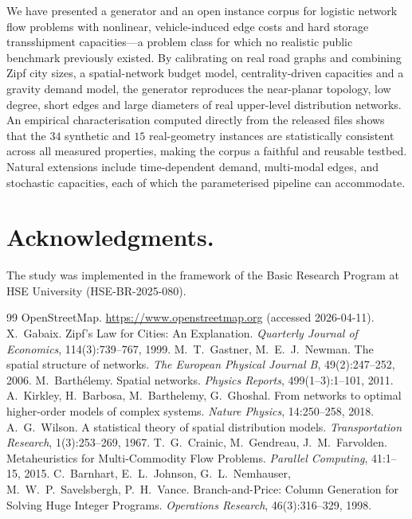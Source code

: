 \documentclass[11pt]{article}
\begin{document}
We have presented a generator and an open instance corpus for logistic network
flow problems with nonlinear, vehicle-induced edge costs and hard storage
transshipment capacities---a problem class for which no realistic public
benchmark previously existed. By calibrating on real road graphs and combining
Zipf city sizes, a spatial-network budget model, centrality-driven capacities and
a gravity demand model, the generator reproduces the near-planar topology, low
degree, short edges and large diameters of real upper-level distribution
networks. An empirical characterisation computed directly from the released files
shows that the $34$ synthetic and $15$ real-geometry instances are statistically
consistent across all measured properties, making the corpus a faithful and
reusable testbed. Natural extensions include time-dependent demand, multi-modal
edges, and stochastic capacities, each of which the parameterised pipeline can
accommodate.

\section{Acknowledgments.}
The study was implemented in the framework of the Basic Research Program at
HSE University (HSE-BR-2025-080).

\begin{thebibliography}{99}
\small
{} OpenStreetMap. \url{https://www.openstreetmap.org} (accessed
2026-04-11).
 X.~Gabaix. Zipf's Law for Cities: An Explanation.
\textit{Quarterly Journal of Economics}, 114(3):739--767, 1999.
 M.~T.~Gastner, M.~E.~J.~Newman. The spatial structure of
networks. \textit{The European Physical Journal B}, 49(2):247--252, 2006.
 M.~Barth\'elemy. Spatial networks. \textit{Physics
Reports}, 499(1--3):1--101, 2011.
 A.~Kirkley, H.~Barbosa, M.~Barthelemy, G.~Ghoshal. From
networks to optimal higher-order models of complex systems. \textit{Nature
Physics}, 14:250--258, 2018.
 A.~G.~Wilson. A statistical theory of spatial distribution
models. \textit{Transportation Research}, 1(3):253--269, 1967.
 T.~G.~Crainic, M.~Gendreau, J.~M.~Farvolden.
Metaheuristics for Multi-Commodity Flow Problems. \textit{Parallel Computing},
41:1--15, 2015.
 C.~Barnhart, E.~L.~Johnson, G.~L.~Nemhauser,
M.~W.~P.~Savelsbergh, P.~H.~Vance. Branch-and-Price: Column Generation for
Solving Huge Integer Programs. \textit{Operations Research}, 46(3):316--329,
1998.
\end{thebibliography}
\end{document}
